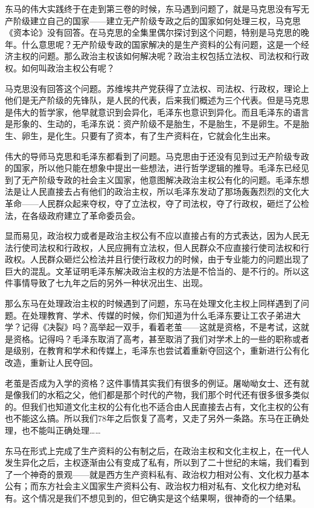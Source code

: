 \documentclass[UTF8, 12pt, a4paper]{ctexrep}
\begin{document}
东马的伟大实践终于在走到第三卷的时候，东马遇到问题了，就是马克思没有写无产阶级建立自己的国家——建立无产阶级专政之后的国家如何处理三权，马克思《资本论》没有回答。在马克思的全集里偶尔探讨到这个问题，特别是马克思的晚年。什么意思呢？无产阶级专政的国家解决的是生产资料的公有问题，这是一个经济主权的问题。那么政治主权该如何解决呢？政治主权包括立法权、司法权和行政权。如何叫政治主权公有呢？

马克思没有回答这个问题。苏维埃共产党获得了立法权、司法权、行政权，理论上他们是无产阶级的先锋队，是人民的代表，后来我们概述为三个代表。但是马克思是伟大的哲学家，他早就意识到会异化，毛泽东也意识到异化。而且毛泽东的语言是形象的、生动的，毛泽东说：资产阶级不是胎生，不是胎生，不是卵生。不是胎生、卵生，是化生。只要有了资本，有了生产资料在，它就会化生出来。

伟大的导师马克思和毛泽东都看到了问题。马克思由于还没有见到过无产阶级专政的国家，所以他只能在想象中提出一些想法，进行哲学逻辑的推导。毛泽东已经见到了无产阶级专政的社会主义国家，他意图解决政治主权公有化的问题。毛泽东想法是让人民直接去占有他们的政治主权，所以毛泽东发动了那场轰轰烈烈的文化大革命——人民群众起来夺权，夺了立法权，夺了司法权，夺了行政权，砸烂了公检法，在各级政府建立了革命委员会。

显而易见，政治权力或者是政治主权公有不应以直接占有的方式表达，因为人民无法行使司法权和行政权，人民应拥有立法权，但人民群众不应直接行使司法权和行政权。人民群众砸烂公检法并且行使行政权力的时候，由于专业能力的问题出现了巨大的混乱。文革证明毛泽东解决政治主权的方法是不恰当的、是不行的。所以这件事情导致了七九年之后的另外一种状况出生、出现。

那么东马在处理政治主权的时候遇到了问题，东马在处理文化主权上同样遇到了问题。在处理教育、学术、传媒的时候，你们知道为什么毛泽东要让工农子弟进大学？记得《决裂》吗？高举起一双手，看着老茧——这就是资格，不是考试，这就是资格。记得吗？毛泽东取消了高考，甚至取消了我们对学术上的一些的职称或者是级别，在教育和学术和传媒上，毛泽东也尝试着重新夺回这个，重新进行公有化改造，重新让人民夺回。

老茧是否成为入学的资格？这件事情其实我们有很多的例证。屠呦呦女士、还有就是像我们的水稻之父，他们都是那个时代的产物，我们那个时代还有很多很多类似的。但我们也知道文化主权的公有化也不适合由人民直接去占有，文化主权的公有也不能这么搞。所以我们78年之后恢复了高考，又走了另外一条路。东马在正确处理，也不能叫正确处理……

东马在形式上完成了生产资料的公有制之后，在政治主权和文化主权上，在一代人发生异化之后，主权逐渐由公有变成了私有，所以到了二十世纪的末端，我们看到了一个神奇的景观——就是西方生产资料私有、政治权力相对公有、文化权力基本公有；而东方社会主义国家生产资料公有、政治权力相对私有、文化权力绝对私有。这个情况是我们不想见到的，但它确实是这个结果啊，很神奇的一个结果。
\end{document}
